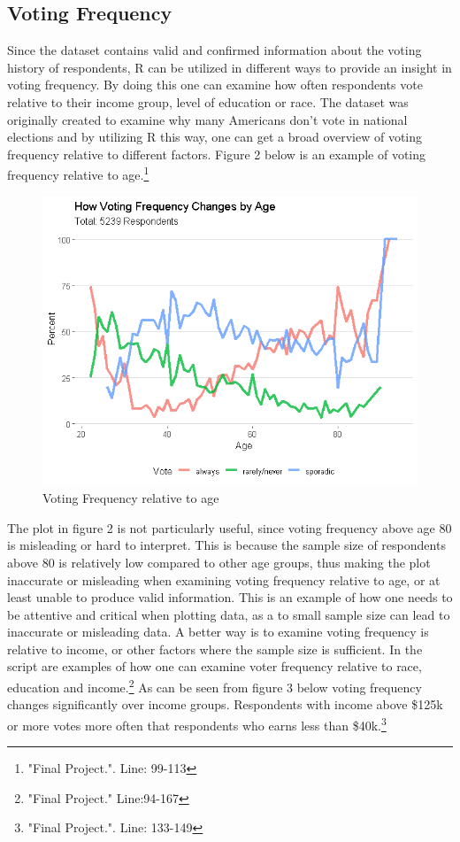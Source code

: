 \documentclass{article}
\begin{document}
\subsection{Voting Frequency}
Since the dataset contains valid and confirmed information about the voting history of respondents, R can be utilized in different ways to provide an insight in voting frequency. By doing this one can examine how often respondents vote relative to their income group, level of education or race. The dataset was originally created to examine why many Americans don’t vote in national elections and by utilizing R this way, one can get a broad overview of voting frequency relative to different factors. Figure 2 below is an example of voting frequency relative to age.\footnote{"Final Project.". Line: 99-113}  

\begin{figure}[!ht]
  \centering
  \includegraphics[width=\textwidth]{vote_age.png}
  \caption{Voting Frequency relative to age}
\end{figure}
\pagebreak

The plot in figure 2 is not particularly useful, since voting frequency above age 80 is misleading or hard to interpret. This is because the sample size of respondents above 80 is relatively low compared to other age groups, thus making the plot inaccurate or misleading when examining voting frequency relative to age, or at least unable to produce valid information. This is an example of how one needs to be attentive and critical when plotting data, as a to small sample size can lead to inaccurate or misleading data. A better way is to examine voting frequency is relative to income, or other factors where the sample size is sufficient. In the script are examples of how one can examine voter frequency relative to race, education and income.\footnote{"Final Project." Line:94-167} As can be seen from figure 3 below voting frequency changes significantly over income groups. Respondents with income above \$125k or more votes more often that respondents who earns less than \$40k.\footnote{"Final Project.". Line: 133-149} 
\end{document}
